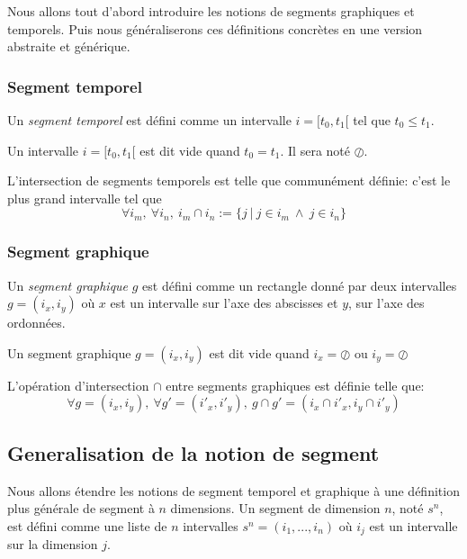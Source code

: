 \documentclass{article}
\newcommand{\emptyseg}		{\ensuremath{\oslash}}
\begin{document}
Nous allons tout d'abord introduire les notions de segments graphiques et temporels. Puis nous généraliserons ces définitions concrètes en une version abstraite et générique.


\subsubsection{Segment temporel}

Un \emph{segment temporel} est défini comme un intervalle
 $i=[t_{0},t_{1}[$ tel que $t_{0} \leqslant t_{1}$.

Un intervalle $i=[t_{0},t_{1}[$ est dit vide quand $t_{0} = t_{1}$. Il sera noté \emptyseg.

L'intersection de segments temporels est telle que communément définie: c'est le plus grand intervalle tel que 
\[ \forall i_{m},\ \forall  i_{n}, 
\ i_{m} \cap i_{n}  := \{ j \ |\ j \in i_m \ \land\ j \in i_n \}
\]


\subsubsection{Segment graphique}
Un \emph{segment graphique} $g$ est défini comme un rectangle donné par deux intervalles $g=(i_x,i_y)$ où $x$ est un intervalle sur l'axe des abscisses et $y$, sur l'axe des ordonnées.

Un segment graphique $g=(i_x,i_y)$ est dit vide quand $i_x = \emptyseg $ ou $i_y = \emptyseg $

L'opération d'intersection $\cap$ entre segments graphiques est définie telle que:
{\small
\[ \forall g=(i_x,i_y),\ \forall  g'=(i'_x,i'_y),\ 
g \cap g' = (i_x \cap i'_x, i_y \cap i'_y)
\]
}

\subsection{Generalisation de la notion de segment}
\label{segments}

Nous allons étendre les notions de segment temporel et graphique à une définition plus générale de segment à $n$ dimensions.
Un segment de dimension $n$, noté $s^n$, est défini comme une liste de $n$ intervalles $s^n=(i_1,...,i_n)$ où $i_j$ est un intervalle sur la dimension $j$.
\end{document}
